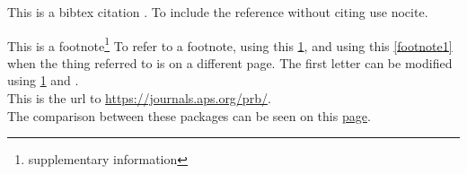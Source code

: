 \documentclass{article}
\begin{document}
This is a bibtex citation \cite{PhysRevB.78.104104}.
To include the reference without citing use nocite. \nocite{PhysRevLett.99.077601}

This is a footnote\footnote{\label{footnote1}supplementary information}
\newpage
To refer to a footnote, using this \ref{footnote1}, and using this \vref{footnote1} when the thing referred to is on a different page. The first letter can be modified using \cref{footnote1} and . \\
This is the url to \url{https://journals.aps.org/prb/}. \\
The comparison between these packages can be seen on this \href{https://tex.stackexchange.com/questions/83037/difference-between-ref-varioref-and-cleveref-decision-for-a-thesis}{page}.


% 
% 
\end{document}
